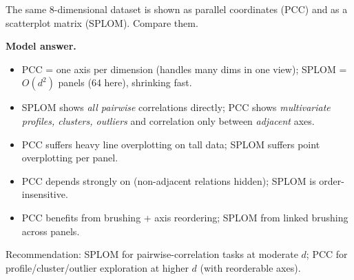 \begin{qbox}
The same 8-dimensional dataset is shown as parallel coordinates (PCC) and as a
scatterplot matrix (SPLOM). Compare them.

\medskip\noindent\textbf{Model answer.}
\begin{itemize}[leftmargin=1.4em]
  \item {} PCC = one axis per dimension (handles many
        dims in one view); SPLOM = $O(d^2)$ panels (64 here), shrinking fast.
  \item {} SPLOM shows \emph{all pairwise} correlations directly;
        PCC shows \emph{multivariate profiles, clusters, outliers} and
        correlation only between \emph{adjacent} axes.
  \item {} PCC suffers heavy line overplotting on tall data;
        SPLOM suffers point overplotting per panel.
  \item {} PCC depends strongly on 
        (non-adjacent relations hidden); SPLOM is order-insensitive.
  \item {} PCC benefits from brushing + axis reordering; SPLOM
        from linked brushing across panels.
\end{itemize}
Recommendation: SPLOM for pairwise-correlation tasks at moderate $d$; PCC for
profile/cluster/outlier exploration at higher $d$ (with reorderable axes).
\end{qbox}


